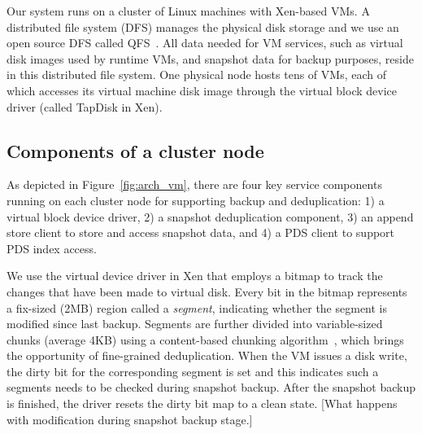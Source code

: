 Our system runs on a cluster of Linux machines with Xen-based VMs.
A distributed file system (DFS) manages  the physical disk storage and we use 
an open source DFS called QFS~\cite{QFS}. 
All data needed for VM services, such as virtual disk images used by runtime VMs,
and snapshot data for backup purposes, reside in this distributed file system. 
One physical node hosts tens of VMs, each of which accesses its virtual machine disk image through the
virtual block device driver (called TapDisk\cite{Warfield2005} in Xen).



\subsection{ Components of a cluster node } 

As  depicted in Figure~\ref{fig:arch_vm}, 
there are four key service components running on each cluster
node  for supporting backup and deduplication: 
1) a virtual block device driver, 2) a snapshot deduplication component,
3) an append store client to store  and access snapshot data,
and 4)  a PDS client to support PDS index access. 


We use the virtual device driver in Xen that employs a bitmap to track the changes 
that have been made to virtual disk.
Every bit in the bitmap represents a fix-sized (2MB) region called a \textit{segment}, indicating whether the segment
is modified since last backup. 
Segments are further divided into variable-sized chunks (average 4KB) 
using a content-based chunking algorithm~\cite{?}, 
which brings the opportunity of fine-grained deduplication.
When the VM issues a disk write, the dirty bit for the corresponding segment is set
and this indicates such a segments needs to be checked during snapshot backup. 
After the snapshot backup is finished, the driver resets the dirty bit map to a clean state.
[What happens with modification during snapshot backup stage.]


